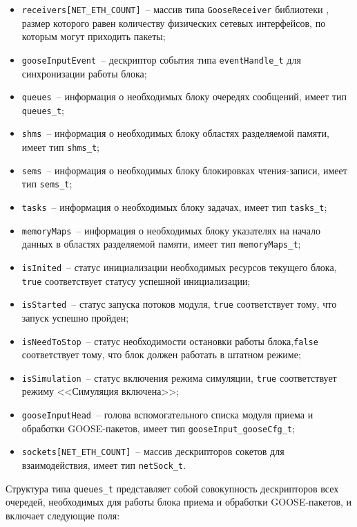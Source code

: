 \begin{itemize}
    \item \lstinline{receivers[NET_ETH_COUNT]}~-- массив типа \lstinline{GooseReceiver} библиотеки \libIec, размер которого равен количеству физических сетевых интерфейсов, по которым могут приходить пакеты;
    \item \lstinline{gooseInputEvent}~-- дескриптор события типа \lstinline{eventHandle_t} для синхронизации работы блока;
    \item \lstinline{queues}~-- информация о необходимых блоку очередях сообщений, имеет тип \lstinline{queues_t};
    \item \lstinline{shms}~-- информация о необходимых блоку областях разделяемой памяти, имеет тип \lstinline{shms_t};
    \item \lstinline{sems}~-- информация о необходимых блоку блокировках чтения-записи, имеет тип \lstinline{sems_t};
    \item \lstinline{tasks}~-- информация о необходимых блоку задачах, имеет тип \lstinline{tasks_t};
    \item \lstinline{memoryMaps}~-- информация о необходимых блоку указателях на начало данных в областях разделяемой памяти, имеет тип \lstinline{memoryMaps_t};
    \item \lstinline{isInited}~-- статус инициализации необходимых ресурсов текущего блока, \lstinline{true} соответствует статусу успешной инициализации;
    \item \lstinline{isStarted}~-- статус запуска потоков модуля, \lstinline{true} соответствует тому, что запуск успешно пройден;
    \item \lstinline{isNeedToStop}~-- статус необходимости остановки работы блока,\lstinline{false} соответствует тому, что блок должен работать в штатном режиме;
    \item \lstinline{isSimulation}~-- статус включения режима симуляции, \lstinline{true} соответствует режиму <<Симуляция включена>>;
    \item \lstinline{gooseInputHead}~-- голова вспомогательного списка модуля приема и обработки GOOSE-пакетов, имеет тип \lstinline{gooseInput_gooseCfg_t};
    \item \lstinline{sockets[NET_ETH_COUNT]}~-- массив дескрипторов сокетов для взаимодействия, имеет тип \lstinline{netSock_t}.
\end{itemize}

Структура типа \lstinline{queues_t} представляет собой совокупность дескрипторов всех очередей, необходимых для работы блока приема и обработки GOOSE-пакетов, и включает следующие поля:

